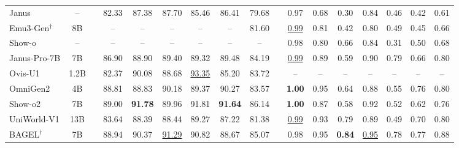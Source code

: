 \begin{table}[!t]
{\begin{tabular}{@{}l c c c c c c c c c c c c c c c c@{}}
Janus \cite{wu2025janus}
& --
& \metricssep
& 82.33 & 87.38 & 87.70 & 85.46 & 86.41 & 79.68
& \metricssep
& 0.97 & 0.68 & 0.30 & 0.84 & 0.46 & 0.42 & 0.61 \\


Emu3-Gen$^\dagger$ \cite{wang2024emu3}
& 8B
& \metricssep
& -- & -- & -- & -- & -- & 81.60
& \metricssep
& \underline{0.99} & 0.81 & 0.42 & 0.80 & 0.49 & 0.45 & 0.66 \\

Show-o \cite{xie2024show}
& --
& \metricssep
& -- & -- & -- & -- & -- & --
& \metricssep
& 0.98 & 0.80 & 0.66 & 0.84 & 0.31 & 0.50 & 0.68 \\

Janus-Pro-7B \cite{chen2025janus}
& 7B
& \metricssep
& 86.90 & 88.90 & 89.40 & 89.32 & 89.48 & 84.19
& \metricssep
& \underline{0.99} & 0.89 & 0.59 & 0.90 & 0.79 & 0.66 & 0.80 \\


Ovis-U1 \cite{wang2025ovis}
& 1.2B
& \metricssep
& 82.37 & 90.08 & 88.68 & \underline{93.35} & 85.20 & 83.72
& \metricssep
& -- & -- & -- & -- & -- & -- & -- \\

OmniGen2 \cite{wu2025omnigen2}
& 4B
& \metricssep
& 88.81 & 88.83 & 90.18 & 89.37 & 90.27 & 83.57
& \metricssep
& \textbf{1.00} & 0.95 & 0.64 & 0.88 & 0.55 & 0.76 & 0.80 \\

Show-o2 \cite{xie2025show}
& 7B
& \metricssep
& 89.00 & \textbf{91.78} & 89.96 & 91.81 & \textbf{91.64} & 86.14
& \metricssep
& \textbf{1.00} & 0.87 & 0.58 & 0.92 & 0.52 & 0.62 & 0.76 \\

UniWorld-V1 \cite{lin2025uniworld}
& 13B
& \metricssep
& 83.64 & 88.39 & 88.44 & 89.27 & 87.22 & 81.38
& \metricssep
& \underline{0.99} & 0.93 & 0.79 & 0.89 & 0.49 & 0.70 & 0.80 \\

BAGEL$^\dagger$ \cite{deng2025emerging}
& 7B
& \metricssep
& 88.94 & 90.37 & \underline{91.29} & 90.82 & 88.67 & 85.07
& \metricssep
& 0.98 & 0.95 & \textbf{0.84} & \underline{0.95} & 0.78 & 0.77 & 0.88 \\


\end{tabular}}
\end{table}
